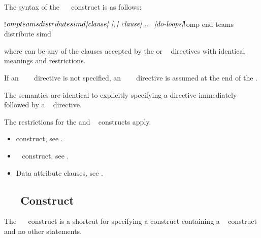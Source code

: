 \begin{fortranspecific}
The syntax of the ~~ construct is as follows:

\begin{ompfPragma}
!$omp teams distribute simd \plc{[clause[ [},\plc{] clause] ... ]}
    \plc{do-loops}
\plc{[}!$omp end teams distribute simd\plc{]}
\end{ompfPragma}

where  can be any of the clauses accepted by the  or ~
directives with identical meanings and restrictions.

If an ~~~ directive is
not specified, an ~~~
directive is assumed at the end of the .
\end{fortranspecific}

\descr
The semantics are identical to explicitly specifying a  directive immediately
followed by a ~ directive.


\restrictions
The restrictions for the  and ~ constructs apply.

\crossreferences
\begin{itemize}
\item {} construct, see
.

\item {}~ construct, see
.

\item Data attribute clauses, see
.
\end{itemize}











\subsection{~~ Construct}
\label{subsec:target teams distribute construct}
\summary
The ~~ construct is a shortcut for specifying a  construct
containing a ~ construct and no other statements.

